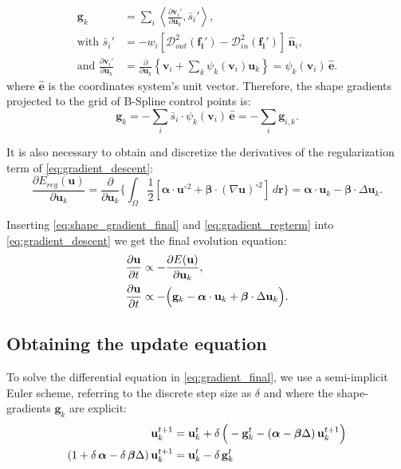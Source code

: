 \documentclass[a4paper]{report}
\providecommand{\mdist}[2]{ \mathcal{D}_{#2}^2(\mathbf{#1}) }
\renewcommand{\vec}[1]{\mathbf{#1}}
\begin{document}
  \begin{align}
  \vec{g}_k &= \underset{i}{\sum} \left\langle \frac{\partial \vec{v}_i'}{\partial \vec{u}_k}, \bar{s}_i'\right\rangle, \\
  \text{with }
  \bar{s}_i' &= - w_i \left[ \mdist{f_i'}{out} - \mdist{f_i'}{in} \right] \, \hat{\vec{n}}_i, \\
  \text{and }
  \frac{\partial \vec{v}_i'}{\partial \vec{u}_k} &=
  \frac{\partial}{\partial \vec{u}_k} \left\{ \vec{v}_i + \sum_k \psi_k(\vec{v}_i) \vec{u}_k \right\} = \psi_k(\vec{v}_i)\, \hat{\vec{e}}.
  \label{eq:gradient_wshape}
  \end{align}%
  where $\hat{\vec{e}}$ is the coordinates system's unit vector.
Therefore, the shape gradients projected to the grid of B-Spline control points is:
\begin{equation}
  \vec{g}_k = - \underset{i}{\sum} \bar{s}_i \cdot \psi_k(\vec{v}_i) \, \hat{\vec{e}} = - \underset{i}{\sum} \vec{g}_{i,k}.
  \label{eq:shape_gradient_final}
\end{equation}

It is also necessary to obtain and discretize the derivatives of the regularization term of \eqref{eq:gradient_descent}:
  \begin{equation}
  \frac{\partial E_{reg}(\vec{u})}{\partial \vec{u}_k} = \frac{ \partial }{\partial \vec{u}_k} \Big\{
  \int_{\Omega} \frac12 [ \boldsymbol{\alpha} \cdot \vec{u}^{\circ2}
  + \boldsymbol{\beta} \cdot (\nabla \vec{u})^{\circ2} ] \,d\vec{r}
  \Big\} = \boldsymbol{\alpha} \cdot \vec{u}_k - \boldsymbol{\beta} \cdot \Delta \vec{u}_k.
  \label{eq:gradient_regterm}
  \end{equation}

Inserting \eqref{eq:shape_gradient_final} and \eqref{eq:gradient_regterm} into \eqref{eq:gradient_descent} we get the
  final evolution equation:
  \begin{align}
  \frac{\partial \vec{u}}{\partial t} &\propto - \frac{\partial E(\vec{u})}{\partial \vec{u}_k}, \notag\\
  \frac{\partial \vec{u}}{\partial t} &\propto - \Big( \vec{g}_k - \boldsymbol{\alpha} \cdot \vec{u}_k + \boldsymbol{\beta} \cdot \Delta \vec{u}_k \Big).
  \label{eq:gradient_final}
  \end{align}


\subsection{Obtaining the update equation} To solve the differential equation in \eqref{eq:gradient_final},
  we use a semi-implicit Euler scheme, referring to the discrete step size as $\delta$ and where the
  shape-gradients $\vec{g}_k$ are explicit:
\begin{align}
  \vec{u}_k^{t+1} &= \vec{u}_k^{t} + \delta \, \Big( - \vec{g}_k^{t} - ( \boldsymbol{\alpha} - \boldsymbol{\beta} \Delta) \, \vec{u}_k^{t+1} \Big) \notag \\
  (1 + \delta \, \boldsymbol{\alpha} - \delta \, \boldsymbol{\beta} \Delta)\, \vec{u}_k^{t+1} &= \vec{u}_k^{t} - \delta\, \vec{g}_k^{t}
  \label{eq:discrete_derivative}
\end{align}
\end{document}

